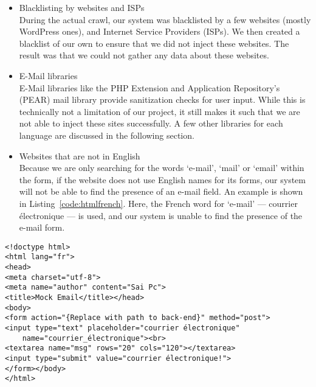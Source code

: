 \begin{itemize}
		\item Blacklisting by websites and ISPs\\
        During the actual crawl, our system was blacklisted by a few websites (mostly WordPress ones), and Internet Service Providers (ISPs). We then created a blacklist of our own to ensure that we did not inject these websites. The result was that we could not gather any data about these websites.
		
		\item E-Mail libraries\\
        E-Mail libraries like the PHP Extension and Application Repository's (PEAR) mail library provide sanitization checks for user input. While this is technically not a limitation of our project, it still makes it such that we are not able to inject these sites successfully.
        A few other libraries for each language are discussed in the following section.
        
        \item Websites that are not in English\\
        Because we are only searching for the words `e-mail', `mail' or `email' within the form, if the website does not use English names for its forms, our system will not be able to find the presence of an e-mail field. An example is shown in Listing~\ref{code:htmlfrench}. Here, the French word for `e-mail' --- courrier électronique --- is used, and our system is unable to find the presence of the e-mail form.
	\end{itemize}
	
\begin{lstlisting}
<!doctype html>
<html lang="fr">
<head>
<meta charset="utf-8">
<meta name="author" content="Sai Pc">
<title>Mock Email</title></head>
<body>
<form action="{Replace with path to back-end}" method="post">
<input type="text" placeholder="courrier électronique" 
	name="courrier_électronique"><br>
<textarea name="msg" rows="20" cols="120"></textarea>
<input type="submit" value="courrier électronique!">
</form></body>
</html>
\end{lstlisting}

